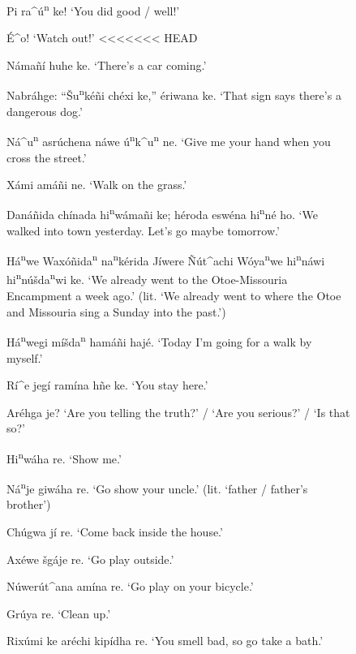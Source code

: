 \documentclass[output=paper]{LSP/langsci}
\begin{document}
\begin{figure}[p]
\begin{list}{}{} \itemsep1pt \parskip0pt 
\item{Pi ra\^{ }\'u\textsuperscript{n} ke! `You did good / well!'}
\item{\'E\^{ }o! `Watch out!'}
<<<<<<< HEAD
\item{Námañí huhe ke. `There's a car coming.'}
\item{Nabráhge: ``\v{S}u\textsuperscript{n}k\'eñi ch\'exi ke,'' \'eriwana ke. `That sign says there's a dangerous dog.'}
\item{Ná\^{ }u\textsuperscript{n} asr\'uchena náwe \'u\textsuperscript{n}k\^{ }u\textsuperscript{n} ne. `Give me your hand when you cross the street.'}
\item{Xámi amáñi ne. `Walk on the grass.'}
\item{Danáñida chínada hi\textsuperscript{n}wámañi ke; h\'eroda esw\'ena hi\textsuperscript{n}n\'e ho. `We walked into town yesterday. Let's go maybe tomorrow.'}
\item{Há\textsuperscript{n}we Waxóñida\textsuperscript{n} na\textsuperscript{n}k\'erida Jíwere \~N\'ut\^{ }achi Wóya\textsuperscript{n}we hi\textsuperscript{n}náwi hi\textsuperscript{n}n\'u\v{s}da\textsuperscript{n}wi ke. `We already went to the Otoe-Missouria Encampment a week ago.' (lit. `We already went to where the Otoe and Missouria sing a Sunday into the past.')}
\item{Há\textsuperscript{n}wegi mí\v{s}da\textsuperscript{n} hamáñi haj\'e.  `Today I'm going for a walk by myself.'}
\item{Rí\^{ }e jegí ramína hñe ke. `You stay here.'}
\item{Ar\'ehga je? `Are you telling the truth?' / `Are you serious?' / `Is that so?'}
\item{Hi\textsuperscript{n}wáha re. `Show me.'}
\item{Ná\textsuperscript{n}je giwáha re. `Go show your uncle.' (lit. `father / father's brother')}
\item{Ch\'ugwa jí re.	`Come back inside the house.'}
\item{}
\item{Ax\'ewe \v{s}gáje re. `Go play outside.'}
\item{N\'uwer\'ut\^{ }ana amína re.	`Go play on your bicycle.'}
\item{Gr\'uya re.	`Clean up.'}
\item{Rix\'umi ke ar\'echi kipídha re. `You smell bad, so go take a bath.'}

\end{list}
\end{figure}
\end{document}
